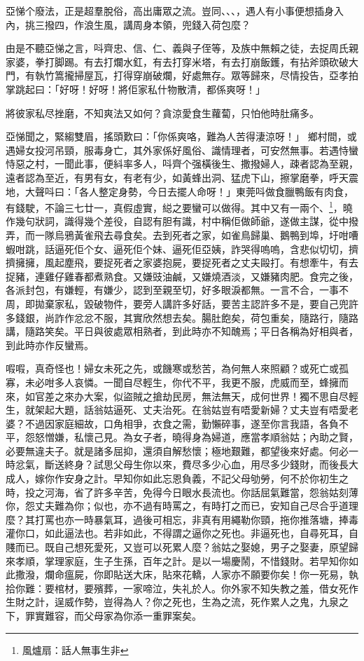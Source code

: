 \documentclass[a5paper, 12pt, openany]{book} %
\begin{document}
	亞悌个廢法，正是超羣脫俗，高出庸眾之流。豈同、、、，遇人有小事便想插身入內，挑三撥四，作浪生風，講周身本領，兜錢入荷包麼？

	由是不聽亞悌之言，呌齊忠、信、仁、義與子侄等，及族中無賴之徒，去捉周氏親家婆，拳打脚踢。有去打爛水釭，有去打穿米塔，有去打崩飯鑊，有拈斧頭砍破大門，有執竹篙攏掃屋瓦，打得穿崩破爛，好處無存。眾等歸來，尽情投告，亞孝拍掌跳起曰：「好呀！好呀！將佢家私什物散清，都係爽呀！」

	將彼家私尽挫磨，不知爽法又如何？貪涼愛食生蘿蔔，只怕他時肚痛多。

	亞悌聞之，緊縐雙眉，搖頭歎曰：「你係爽咯，難為人苦得淒涼呀！」 鄉村間，或遇婦女投河吊頸，服毒身亡，其外家係好風俗、識情理者，可安然無事。若遇恃蠻恃惡之村，一聞此事，便紏率多人，呌齊个强橫後生、撒撥婦人，疎者認為至親，遠者認為至近，有男有女，有老有少，如黃蜂出洞、猛虎下山，擦掌磨拳，呼天震地，大聲呌曰：「各人整定身勢，今日去擺人命呀！」東莞呌做食臘鴨飯有肉食，有錢駛，不論三七廿一，真假虛實，縂之要蠻可以做得。其中又有一兩个、\footnote{風爐扇：話人無事生非}，曉作幾句狀詞，識得幾个差役，自認有胆有識，村中稱佢做師爺，遂做主謀，從中撥弄，而一隊烏鴉黃雀飛去尋食矣。去到死者之家，如雀鳥歸巢、鵝鴨到埠，圩咁嘈蝦咁跳，話逼死佢个女、逼死佢个妹、逼死佢亞姨，詐哭得嗚嗚，含悲似切切，擠擠擁擁，風起塵飛，要捉死者之家婆抱屍，要捉死者之丈夫毆打。有想牽牛，有去捉豬，連雞仔雞春都煮熟食。又嫌豉油鹹，又嫌燒酒淡，又嫌豬肉肥。食完之後，各派封包，有嫌輕，有嫌少，認到至親至切，好多眼淚都無。一言不合，一事不周，即拋棄家私，毀破物件，要旁人講許多好話，要苦主認許多不是，要自己兜許多錢銀，尚詐作忿忿不服，其實欣然想去矣。腸肚飽矣，荷包重矣，隨路行，隨路講，隨路笑矣。平日與彼處眾相熟者，到此時亦不知醜焉；平日各稱為好相與者，到此時亦作反蠻焉。

	㗇㗇，真奇怪也！婦女未死之先，或饑寒或愁苦，為何無人來照顧？或死亡或孤寡，未必咁多人哀憐。一聞自尽輕生，你代不平，我更不服，虎威而至，蜂擁而來，如官差之來办大案，似盜賊之搶劫民房，無法無天，成何世界！獨不思自尽輕生，就架起大題，話翁姑逼死、丈夫治死。在翁姑豈有唔愛新婦？丈夫豈有唔愛老婆？不過因家庭細故，口角相爭，衣食之需，勤懶碎事，遂至你言我語，各負不平，怨怒憎嫌，私懷己見。為女子者，曉得身為婦道，應當孝順翁姑；內助之賢，必要無違夫子。就是諸多屈抑，還須自解愁懷；極地艱難，都望後來好處。何必一時忿氣，斷送終身？試思父母生你以來，費尽多少心血，用尽多少錢財，而後長大成人，嫁你作安身之計。早知你如此忘恩負義，不記父母劬勞，何不於你初生之時，投之河海，省了許多辛苦，免得今日眼水長流也。你話屈氣難當，怨翁姑刻薄你，怨丈夫難為你；似也，亦不過有時罵之，有時打之而已，安知自己尽合乎道理麼？其打罵也亦一時暴氣耳，過後可相忘，非真有用繩勒你頸，拖你推落塘，捧毒灌你口，如此逼法也。若非如此，不得謂之逼你之死也。非逼死也，自尋死耳，自賤而已。既自己想死愛死，又豈可以死累人麼？翁姑之娶媳，男子之娶妻，原望歸來孝順，掌理家庭，生子生孫，百年之計。是以一場慶鬧，不惜錢財。若早知你如此撒潑，爛命瘟屍，你即貼送大床，貼來花轎，人家亦不願要你矣！你一死易，執拾你難：要棺材，要殯葬，一家啼泣，失礼於人。你外家不知失教之羞，借女死作生財之計，逞威作勢，豈得為人？你之死也，生為之流，死作累人之鬼，九泉之下，罪實難容，而父母家為你添一重罪案矣。
\end{document}
